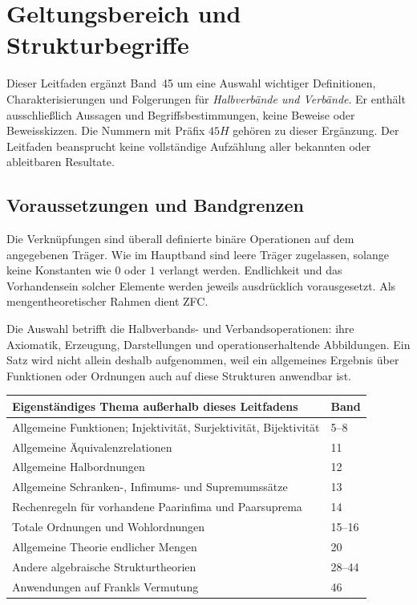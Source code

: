 \chapter{Geltungsbereich und Strukturbegriffe}
\label{b45guide:ch:foundations}

Dieser Leitfaden ergänzt Band~45 um eine Auswahl wichtiger Definitionen,
Charakterisierungen und Folgerungen für \emph{Halbverbände und Verbände}.
Er enthält ausschließlich Aussagen und Begriffsbestimmungen, keine
Beweise oder Beweisskizzen. Die Nummern mit Präfix $45H$ gehören
zu dieser Ergänzung. Der Leitfaden beansprucht keine vollständige
Aufzählung aller bekannten oder ableitbaren Resultate.

\section{Voraussetzungen und Bandgrenzen}

Die Verknüpfungen sind überall definierte binäre Operationen auf dem
angegebenen Träger. Wie im Hauptband sind leere Träger zugelassen,
solange keine Konstanten wie $0$ oder $1$ verlangt werden.
Endlichkeit und das Vorhandensein solcher Elemente werden jeweils
ausdrücklich vorausgesetzt. Als mengentheoretischer Rahmen dient ZFC.

Die Auswahl betrifft die Halbverbands- und Verbandsoperationen:
ihre Axiomatik, Erzeugung, Darstellungen und operationserhaltende
Abbildungen. Ein Satz wird nicht allein deshalb aufgenommen,
weil ein allgemeines Ergebnis über Funktionen oder Ordnungen
auch auf diese Strukturen anwendbar ist.

\begin{center}
\small
\begin{tabularx}{\linewidth}{@{}p{.72\linewidth}X@{}}
\toprule
Eigenständiges Thema außerhalb dieses Leitfadens & Band\\
\midrule
Allgemeine Funktionen; Injektivität, Surjektivität, Bijektivität & 5--8\\
Allgemeine Äquivalenzrelationen & 11\\
Allgemeine Halbordnungen & 12\\
Allgemeine Schranken-, Infimums- und Supremumssätze & 13\\
Rechenregeln für vorhandene Paarinfima und Paarsuprema & 14\\
Totale Ordnungen und Wohlordnungen & 15--16\\
Allgemeine Theorie endlicher Mengen & 20\\
Andere algebraische Strukturtheorien & 28--44\\
Anwendungen auf Frankls Vermutung & 46\\
\bottomrule
\end{tabularx}
\end{center}


